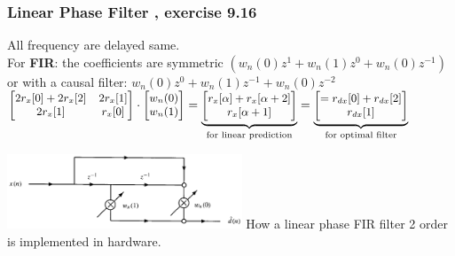 \begin{minipage}{11.5cm}
\subsubsection{Linear Phase Filter , exercise 9.16}
All frequency are delayed same. \\
For \textbf{FIR}: the coefficients are symmetric $(w_n(0)z^1+w_n(1)z^0+w_n(0)z^{-1})$ or with a causal filter: $w_n(0)z^0 + w_n(1)z^{-1} + w_n(0)z^{-2}$\\
$\small \begin{bmatrix}
2 r_x[0] + 2 r_x[2]		&	2 r_x[1] \\
2 r_x[1]				& 	r_x[0]
\end{bmatrix} \cdot \begin{bmatrix}
w_n(0)\\
w_n(1)
\end{bmatrix}= \underbrace{ \begin{bmatrix}
r_x[\alpha] + r_x[\alpha+2]\\
r_x[\alpha+1]
\end{bmatrix}}_{\text{for linear prediction} }
= \underbrace{ \begin{bmatrix} =
r_{dx}[0] + r_{dx}[2]\\
r_{dx}[1]
\end{bmatrix}    }_{\text{for optimal filter} }  $

\end{minipage}
\hspace{3mm}
\begin{minipage}{7cm}
\includegraphics[width=7cm]{../TSM_StatDig/bilder/linear_phase_fir.png}
How a linear phase FIR filter 2 order is implemented in hardware.
\end{minipage}
